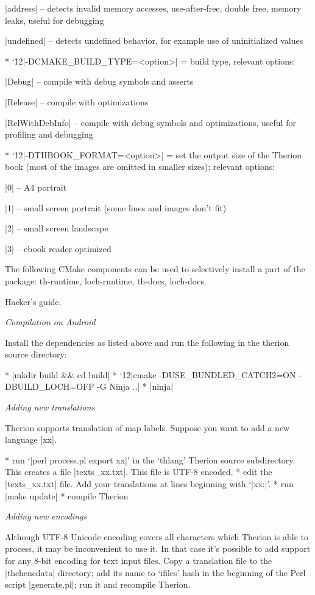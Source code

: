   |address| -- detects invalid memory accesses, use-after-free, double free, memory leaks, useful for debugging

  |undefined| -- detects undefined behavior, for example use of uninitialized values

* {\catcode`\=12|-DCMAKE_BUILD_TYPE=<option>|} = build type, relevant options:

  |Debug| -- compile with debug symbols and asserts

  |Release| -- compile with optimizations

  |RelWithDebInfo| -- compile with debug symbols and optimizations, useful for profiling and debugging

* {\catcode`\=12|-DTHBOOK_FORMAT=<option>|} = set the output size of the Therion book (most of the images are
  omitted in smaller sizes); relevant options:

  |0| -- A4 portrait

  |1| -- small screen portrait (some lines and images don't fit)

  |2| -- small screen landscape

  |3| -- ebook reader optimized

\endlist

The following CMake components can be used to selectively install a part of the package: th-runtime, loch-runtime,
th-docs, loch-docs.

\subsubchapter Hacker's guide.

{\it Compilation on Android}

Install the dependencies as listed above and run the following in the therion source directory:

\list
* |mkdir build && cd build|
* {\catcode`\=12|cmake -DUSE_BUNDLED_CATCH2=ON -DBUILD_LOCH=OFF -G Ninja ..|}
* |ninja|
\endlist


{\it Adding new translations}

\nobreak
Therion supports translation of map labels.
Suppose you want to add a new language |xx|.

\list
* run `|perl process.pl export xx|' in the `thlang' Therion source subdirectory.
  This creates a file |texts_xx.txt|. This file is UTF-8 encoded.
* edit the |texts_xx.txt| file. Add your translations at lines beginning with
  `|xx:|'.
* run |make update|
* compile Therion
\endlist


{\it Adding new encodings}

Although UTF-8 Unicode encoding covers all characters which Therion is able to
process, it may be inconvenient to use it. In that case it's possible to add
support for any 8-bit encoding for text input files. Copy a translation file to
the |thchencdata| directory; add its name to `ifiles' hash in the beginning of
the Perl script |generate.pl|; run it and recompile Therion.

